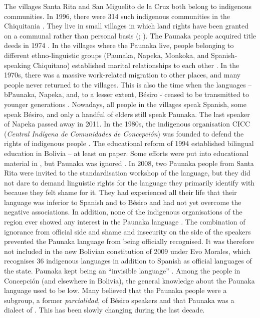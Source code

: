The villages Santa Rita and San Miguelito de la Cruz both belong to indigenous communities. In 1996, there were 314 such indigenous communities in the Chi\-qui\-ta\-nia \citep[337]{Tonelli2004}. They live in small villages in which land rights have been granted on a communal rather than personal basis (\citealt[333]{Tonelli2004}; \citealt[7]{Villalta2013}). The Paunaka people acquired title deeds in 1974 \citep[5]{Villalta2013}.
In the villages where the Paunaka live, people belonging to different ethno-linguistic groups (Paunaka, Napeka, Monkoka, and Spanish-speaking Chiquitano) established marital relationships to each other \citep[6]{Villalta2013}. In the 1970s, there was a massive work-related migration to other places, and many people never returned to the villages. This is also the time when the languages – bPaunaka, Napeka, and, to a lesser extent, Bésiro - ceased to be transmitted to younger generations \citep[5--6]{Villalta2013}. Nowadays, all people in the villages speak Spanish, some speak Bésiro, and only a handful of elders still speak Paunaka. The last speaker of Napeka passed away in 2011.
In the 1980s, the indigenous organisation CICC (\textit{Central Indígena de Comunidades de Concepción}) was founded to defend the rights of indigenous people \citep[7]{Villalta2013}.
The educational reform of 1994 established bilingual education in Bolivia – at least on paper. Some efforts were put into educational material in , but Paunaka was ignored \citep[8]{Villalta2013}.
In 2008, two Paunaka people from Santa Rita were invited to the standardisation workshop of the  language, but they did not dare to demand linguistic rights for the language they primarily identify with because they felt shame for it. They had experienced all their life that their language was inferior to Spanish and to Bésiro and had not yet overcome the negative associations. In addition, none of the indigenous organisations of the region ever showed any interest in the Paunaka language \citep[9--10]{Villalta2013}. The combination of ignorance from official side and shame and insecurity on the side of the speakers prevented the Paunaka language from being officially recognised. It was therefore not included in the new Bolivian constitution of 2009 under Evo Morales, which recognises 36 indigenous languages in addition to Spanish as official languages of the state. Paunaka kept being an “invisible language” \citep[cf.][3]{LangerHavinga2015}.
Among the people in Concepción (and elsewhere in Bolivia), the general knowledge about the Paunaka language used to be low. Many believed that the Paunaka people were a subgroup, a former \textit{parcialidad}, of Bésiro speakers and that Paunaka was a dialect of . This has been slowly changing during the last decade.

